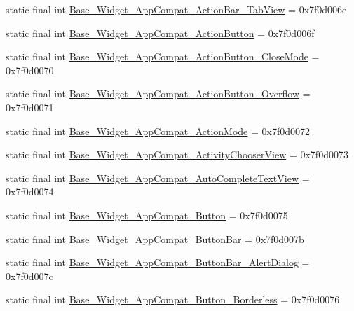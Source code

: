 \begin{DoxyCompactItemize}
\item 
static final int \mbox{\hyperlink{classcom_1_1synnapps_1_1carouselview_1_1_r_1_1style_a2c4c99d4b629435fc8d66892f809c951}{Base\+\_\+\+Widget\+\_\+\+App\+Compat\+\_\+\+Action\+Bar\+\_\+\+Tab\+View}} = 0x7f0d006e
\item 
static final int \mbox{\hyperlink{classcom_1_1synnapps_1_1carouselview_1_1_r_1_1style_a08e75d8ce5057b024e3c314b82421dfd}{Base\+\_\+\+Widget\+\_\+\+App\+Compat\+\_\+\+Action\+Button}} = 0x7f0d006f
\item 
static final int \mbox{\hyperlink{classcom_1_1synnapps_1_1carouselview_1_1_r_1_1style_a2c297c1d126ab1a36d55fd3fae4c9eb0}{Base\+\_\+\+Widget\+\_\+\+App\+Compat\+\_\+\+Action\+Button\+\_\+\+Close\+Mode}} = 0x7f0d0070
\item 
static final int \mbox{\hyperlink{classcom_1_1synnapps_1_1carouselview_1_1_r_1_1style_a9cd779f933e4690e3403c173b201f83c}{Base\+\_\+\+Widget\+\_\+\+App\+Compat\+\_\+\+Action\+Button\+\_\+\+Overflow}} = 0x7f0d0071
\item 
static final int \mbox{\hyperlink{classcom_1_1synnapps_1_1carouselview_1_1_r_1_1style_a79d1830d63110e9049b59bc6bca5beec}{Base\+\_\+\+Widget\+\_\+\+App\+Compat\+\_\+\+Action\+Mode}} = 0x7f0d0072
\item 
static final int \mbox{\hyperlink{classcom_1_1synnapps_1_1carouselview_1_1_r_1_1style_a4eb686b5527a4b09d11b27ea5ce7ae78}{Base\+\_\+\+Widget\+\_\+\+App\+Compat\+\_\+\+Activity\+Chooser\+View}} = 0x7f0d0073
\item 
static final int \mbox{\hyperlink{classcom_1_1synnapps_1_1carouselview_1_1_r_1_1style_a5320dc80e98b43b6b6c58e2827723bea}{Base\+\_\+\+Widget\+\_\+\+App\+Compat\+\_\+\+Auto\+Complete\+Text\+View}} = 0x7f0d0074
\item 
static final int \mbox{\hyperlink{classcom_1_1synnapps_1_1carouselview_1_1_r_1_1style_af33e0f5a039512c7ad128015a0cf75a3}{Base\+\_\+\+Widget\+\_\+\+App\+Compat\+\_\+\+Button}} = 0x7f0d0075
\item 
static final int \mbox{\hyperlink{classcom_1_1synnapps_1_1carouselview_1_1_r_1_1style_a374fdb6db5b588ea1aa08c1c2e95c0a2}{Base\+\_\+\+Widget\+\_\+\+App\+Compat\+\_\+\+Button\+Bar}} = 0x7f0d007b
\item 
static final int \mbox{\hyperlink{classcom_1_1synnapps_1_1carouselview_1_1_r_1_1style_a6804b9b644fe76ae02561651c0b990d7}{Base\+\_\+\+Widget\+\_\+\+App\+Compat\+\_\+\+Button\+Bar\+\_\+\+Alert\+Dialog}} = 0x7f0d007c
\item 
static final int \mbox{\hyperlink{classcom_1_1synnapps_1_1carouselview_1_1_r_1_1style_a4decad30de1b99a5c10c31085c176012}{Base\+\_\+\+Widget\+\_\+\+App\+Compat\+\_\+\+Button\+\_\+\+Borderless}} = 0x7f0d0076

\end{DoxyCompactItemize}
